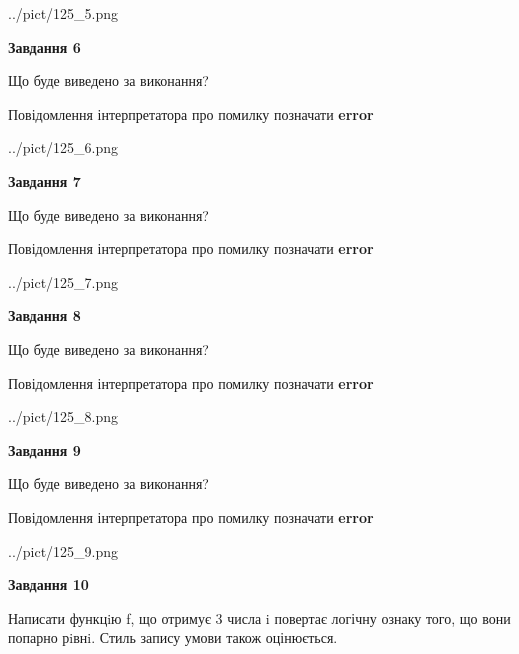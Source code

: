 \documentclass[12pt, ukrainian]{article}
\begin{document}
{\begin {large}
\begin{center}
	{../pict/125_5.png}
\end{center}
\newpage

{\begin {center}\textbf{Завдання 6}\end {center}}\par
Що буде виведено за виконання? \par
Повідомлення інтерпретатора про помилку позначати \textbf{error}

\begin{center}
	{../pict/125_6.png}
\end{center}
\newpage

{\begin {center}\textbf{Завдання 7}\end {center}}\par
Що буде виведено за виконання? \par
Повідомлення інтерпретатора про помилку позначати \textbf{error}

\begin{center}
	{../pict/125_7.png}
\end{center}
\newpage

{\begin {center}\textbf{Завдання 8}\end {center}}\par
Що буде виведено за виконання? \par
Повідомлення інтерпретатора про помилку позначати \textbf{error}

\begin{center}
	{../pict/125_8.png}
\end{center}
\newpage

{\begin {center}\textbf{Завдання 9}\end {center}}\par
Що буде виведено за виконання? \par
Повідомлення інтерпретатора про помилку позначати \textbf{error}

\begin{center}
	{../pict/125_9.png}
\end{center}
\newpage

{\begin {center}\textbf{Завдання 10}\end {center}}\par

Написати функцiю f, що отримує 3 числа i повертає логічну ознаку того, що вони попарно рiвнi. Стиль запису умови також оцінюється.\par
\newpage

\end {large}}
\end{document}
